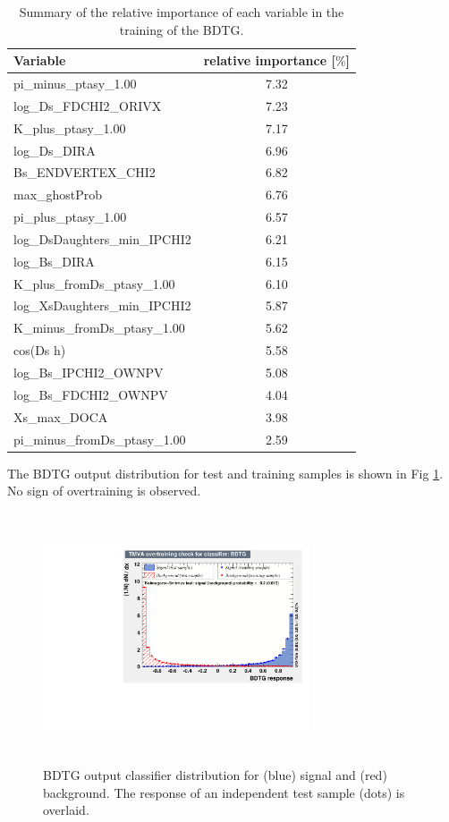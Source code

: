 \begin{table}[h]
\centering
 \begin{tabular}{l c}
Variable & relative importance [$\%$]\\
  \hline
pi\_minus\_ptasy\_1.00 & 7.32\\
log\_Ds\_FDCHI2\_ORIVX & 7.23\\
K\_plus\_ptasy\_1.00 & 7.17\\
log\_Ds\_DIRA & 6.96\\
Bs\_ENDVERTEX\_CHI2 & 6.82\\
max\_ghostProb & 6.76\\
pi\_plus\_ptasy\_1.00 & 6.57\\
log\_DsDaughters\_min\_IPCHI2 & 6.21\\
log\_Bs\_DIRA & 6.15\\
K\_plus\_fromDs\_ptasy\_1.00 & 6.10\\
log\_XsDaughters\_min\_IPCHI2 & 5.87\\
K\_minus\_fromDs\_ptasy\_1.00 & 5.62\\
cos(Ds h) & 5.58\\
log\_Bs\_IPCHI2\_OWNPV & 5.08\\
log\_Bs\_FDCHI2\_OWNPV & 4.04\\
Xs\_max\_DOCA & 3.98\\
pi\_minus\_fromDs\_ptasy\_1.00 & 2.59\\
\end{tabular}
\caption{Summary of the relative importance of each variable in the training of the BDTG.}
\label{table:InputVars}
\end{table}

 
The BDTG output distribution for test and training samples is shown in Fig \ref{fig:BDT_Response}. No sign of overtraining is observed. 

\begin{figure}[h]
\includegraphics[height=7.4cm,width=0.7\textwidth]{figs/BDT_Response_new.pdf}
\caption{BDTG output classifier distribution for (blue) signal and (red) background. The response of an independent test sample (dots) is overlaid.}
\label{fig:BDT_Response}
\end{figure}


